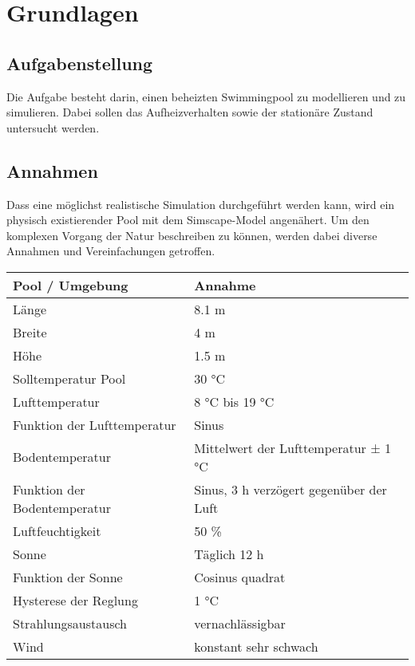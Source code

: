 \section{Grundlagen}
\label{sec:Grundlagen}

\subsection{Aufgabenstellung}
\label{subsec:Aufgabenstellung}
Die Aufgabe besteht darin, einen beheizten Swimmingpool zu modellieren und zu simulieren. Dabei sollen das Aufheizverhalten sowie der stationäre Zustand untersucht werden.

\subsection{Annahmen}
\label{subsec:Annahmen}
Dass eine möglichst realistische Simulation durchgeführt werden kann, wird ein physisch existierender Pool mit dem Simscape-Model angenähert. Um den komplexen Vorgang der Natur beschreiben zu können, werden dabei diverse Annahmen und Vereinfachungen getroffen.

\begin{table}[h]
	\begin{tabular}{l|l}
		Pool / Umgebung              & Annahme                                 \\ \hline
		Länge                        & 8.1 m                                   \\
		Breite                       & 4 m                                     \\
		Höhe                         & 1.5 m                                   \\
		Solltemperatur Pool          & 30 °C                                   \\
		Lufttemperatur      		 & 8 °C bis 19 °C                          \\
		Funktion der Lufttemperatur  & Sinus                                   \\
		Bodentemperatur              & Mittelwert der Lufttemperatur ± 1 °C    \\
		Funktion der Bodentemperatur & Sinus, 3 h verzögert gegenüber der Luft \\
		Luftfeuchtigkeit             & 50 \%                                   \\
		Sonne                        & Täglich 12 h                            \\
		Funktion der Sonne           & Cosinus quadrat                         \\
		Hysterese der Reglung		 & 1 °C									   \\
		Strahlungsaustausch			 & vernachlässigbar						   \\
		Wind						 & konstant sehr schwach
	\end{tabular}
\end{table}


